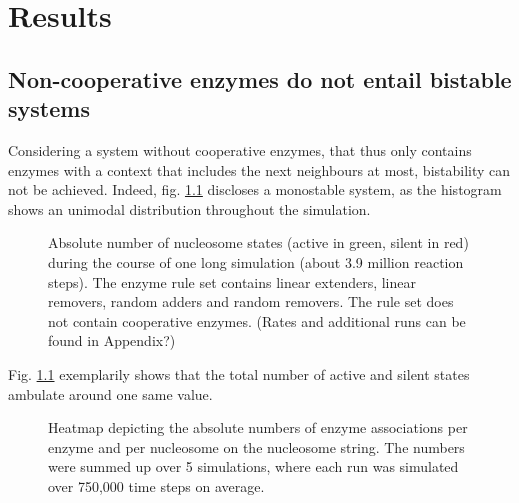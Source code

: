 \chapter{Results}
    \label{cha:results}
    \section{Non-cooperative enzymes do not entail bistable systems}
        \label{sec:ResNon-cooperative}
        Considering a system without cooperative enzymes, that thus only contains enzymes with a context that includes the next neighbours at most, bistability can not be achieved. Indeed, fig. \ref{img:nonCoopSim} discloses a monostable system, as the histogram shows an unimodal distribution throughout the simulation.\\ %
        \begin{figure}[htbp!]
            \centering
            \caption{Absolute number of nucleosome states (active in green, silent in red) during the course of one long simulation (about 3.9 million reaction steps). The enzyme rule set contains linear extenders, linear removers, random adders and random removers. The rule set does not contain cooperative enzymes. {\color{red} (Rates and additional runs can be found in Appendix?)\color{black}}}
            \label{img:nonCoopSim}
        \end{figure}
        Fig. \ref{img:nonCoopSim} exemplarily shows that the total number of active and silent states ambulate around one same value.
        \begin{figure}[htpb!]
            \centering
            \caption{Heatmap depicting the absolute numbers of enzyme associations per enzyme and per nucleosome on the nucleosome string. The numbers were summed up over 5 simulations, where each run was simulated over 750,000 time steps on average.}
            \label{img:nonCoopAssocHeatmap}
        \end{figure}

